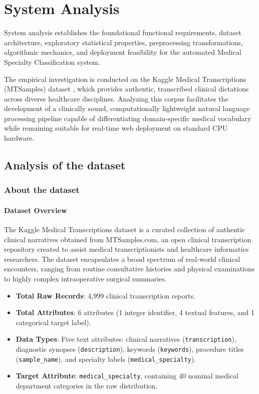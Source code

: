 \clearpage

\section{System Analysis}

System analysis establishes the foundational functional requirements, dataset architecture, exploratory statistical properties, preprocessing transformations, algorithmic mechanics, and deployment feasibility for the automated Medical Specialty Classification system.

The empirical investigation is conducted on the Kaggle Medical Transcriptions (MTSamples) dataset \cite{mtsamples_dataset}, which provides authentic, transcribed clinical dictations across diverse healthcare disciplines. Analyzing this corpus facilitates the development of a clinically sound, computationally lightweight natural language processing pipeline capable of differentiating domain-specific medical vocabulary while remaining suitable for real-time web deployment on standard CPU hardware.

\subsection{Analysis of the dataset}

\subsubsection{About the dataset}

\paragraph{Dataset Overview}
The Kaggle Medical Transcriptions dataset is a curated collection of authentic clinical narratives obtained from MTSamples.com, an open clinical transcription repository created to assist medical transcriptionists and healthcare informatics researchers. The dataset encapsulates a broad spectrum of real-world clinical encounters, ranging from routine consultative histories and physical examinations to highly complex intraoperative surgical summaries.
\begin{itemize}
    \item \textbf{Total Raw Records}: 4,999 clinical transcription reports.
    \item \textbf{Total Attributes}: 6 attributes (1 integer identifier, 4 textual features, and 1 categorical target label).
    \item \textbf{Data Types}: Five text attributes: clinical narratives (\texttt{transcription}), diagnostic synopses (\texttt{description}), keywords (\texttt{keywords}), procedure titles (\texttt{sample\_name}), and specialty labels (\texttt{medical\_specialty}).
    \item \textbf{Target Attribute}: \texttt{medical\_specialty}, containing 40 nominal medical department categories in the raw distribution.
\end{itemize}


